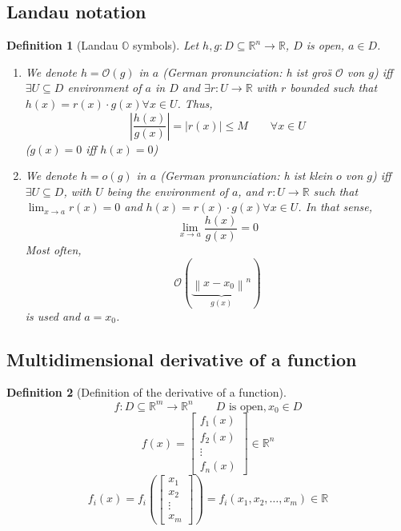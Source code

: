 \documentclass{article}
\newtheorem{definition}{Definition}  \numberwithin{definition}{section}
\newcommand{\norm}[1]{\left\|#1\right\|}
\newcommand{\card}[1]{\left|#1\right|}
\begin{document}
\subsection{Landau notation}
\begin{definition}[Landau $\mathbb O$ symbols] %
  Let $h, g: D \subseteq \mathbb R^n \to \mathbb R$, $D$ is open, $a \in D$.
  \begin{enumerate}
    \item We denote $h = \mathcal O(g)$ in $a$ (German pronunciation: \foreignlanguage{german}{h ist gro\"s $\mathcal O$ von $g$}) iff
      $\exists U \subseteq D$ environment of $a$ in $D$ and $\exists r: U \to \mathbb R$ with $r$ bounded such that $h(x) = r(x) \cdot g(x) \forall x \in U$.
      Thus,
      \[ \card{\frac{h(x)}{g(x)}} = \card{r(x)} \leq M \qquad \forall x \in U \]
      ($g(x) = 0$ iff $h(x) = 0$)
    \item We denote $h = o(g)$ in $a$ (German pronunciation: \foreignlanguage{german}{h ist klein $o$ von $g$}) iff $\exists U \subseteq D$, with $U$ being the environment of $a$, and $r: U \to \mathbb R$ such that $\lim_{x\to a} r(x) = 0$
    and $h(x) = r(x) \cdot g(x) \forall x \in U$. In that sense,
      \[ \lim_{x \to a} \frac{h(x)}{g(x)} = 0 \]
      Most often,
      \[ \mathcal O(\underbrace{\norm{x - x_0}^n}_{g(x)}) \]
      is used and $a = x_0$.
  \end{enumerate}
\end{definition}

\subsection{Multidimensional derivative of a function}
\begin{definition}[Definition of the derivative of a function]
  \[ f: D \subseteq \mathbb R^m \to \mathbb R^n \qquad D \text{ is open}, x_0 \in D \]
  \[ f(x) = \begin{bmatrix} f_1(x) \\ f_2(x) \\ \vdots \\ f_n(x) \end{bmatrix} \in \mathbb R^n \]
  \[ f_i(x) = f_i(\begin{bmatrix} x_1 \\ x_2 \\ \vdots \\ x_m \end{bmatrix}) = f_i(x_1, x_2, \dots, x_m) \in \mathbb R \]
\end{definition}
\end{document}
